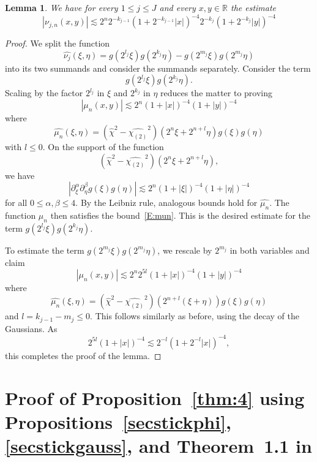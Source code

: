\documentclass[12pt,reqno]{amsart}
\theoremstyle{plain}
\newtheorem{lemma}[theorem]{Lemma}
\theoremstyle{definition}
\numberwithin{equation}{section}
\newcommand{\R}{{\mathbb R}}
\def\wh{\widehat}
\begin{document}
\begin{lemma}\label{lemmadecay1}
We have for every $1\le j\le J$ and every $x,y\in \R$ the estimate 
\[|\nu_{j,n}(x,y)|\lesssim  2^n 2^{- k_{j-1}}(1+2^{- k_{j-1}}|x|)^{-4}2^{- k_{j}}(1+2^{- k_{j}} |y|)^{-4} \]
\end{lemma}


\begin{proof}
We split the function 
\begin{equation*}
\widehat{\nu_j}(\xi,\eta)= g(2^{l_j}\xi) g(2^{k_j}\eta)- g(2^{m_j}\xi)g(2^{m_j}\eta)
\end{equation*}
into its two summands and consider the summands separately.
Consider the term
\[ g(2^{l_j}\xi) g(2^{k_j}\eta).\]
Scaling by the factor $2^{l_j}$ in $\xi$ and $2^{k_j}$ in $\eta$  reduces the matter to proving
\begin{equation}\label{E:mun}
|\mu_{n}(x,y)| \lesssim 2^n(1+|x|)^{-4} (1+|y|)^{-4}
\end{equation}
where
\[\wh{\mu_{n}}(\xi,\eta)= (\widehat{\chi}^2-\widehat{\chi_{(2)}}^2)(2^n\xi+2^{n+l}\eta)g(\xi) g(\eta)\]
with $l \leq 0$.
On the support of the function
\[(\widehat{\chi}^2-\widehat{\chi_{(2)}}^2)(2^n\xi+2^{n+l}\eta), \]
we have 
\[|\partial_\xi^\alpha \partial_\eta^\beta 
g(\xi) g(\eta)|\lesssim 2^n (1+|\xi|)^{-4} (1+|\eta|)^{-4}\]
for all $0\le \alpha,\beta\le 4$. By the Leibniz rule, analogous bounds hold for $\wh{\mu_n}$.
The function $\mu_n$ then satisfies the bound~\eqref{E:mun}.
This is the desired estimate for the term
$g(2^{l_j}\xi) g(2^{k_j}\eta)$. 


To estimate the term $g(2^{m_j}\xi) g(2^{m_j}\eta)$, we rescale by $2^{m_j}$ in both variables and claim
\[
|\mu_{n}(x,y)| \lesssim 2^n 2^{5l}(1+|x|)^{-4} (1+|y|)^{-4}
\]
where
\[\wh{\mu_{n}}(\xi,\eta)= (\widehat{\chi}^2-\widehat{\chi_{(2)}}^2)(2^{n+l}(\xi+\eta))g(\xi) g(\eta)\]
and $l=k_{j-1}-m_j \leq 0$. This follows similarly as before, using the decay of the Gaussians. As
\[
2^{5l}(1+|x|)^{-4} 
\lesssim 2^{-l}(1+2^{-l}|x|)^{-4},
\]
this completes the proof of the lemma.
\end{proof}


 


\section{Proof of Proposition~\ref{thm:4} using Propositions~\ref{secstickphi}, \ref{secstickgauss},
and Theorem~1.1 in 
\texorpdfstring{\cite{MR4510172}}{}}
\label{sec:thm:4}
\end{document}
